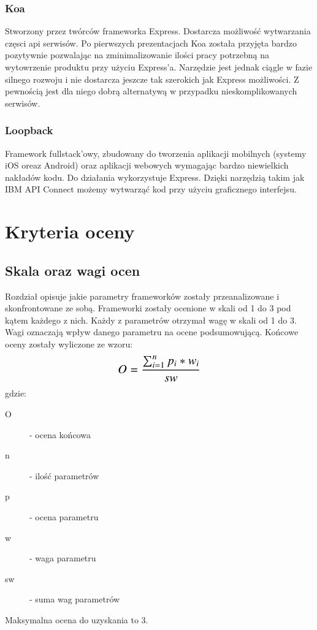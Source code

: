\documentclass[12pt]{report}
\begin{document}
    \subsection{Koa}
    Stworzony przez twórców frameworka Express.
    Dostarcza możliwość wytwarzania częsci api serwisów.
    Po pierwszych prezentacjach Koa została przyjęta bardzo pozytywnie pozwalając na zminimalizowanie ilości pracy potrzebną na wytowrzenie produktu przy użyciu Express'a.
    Narzędzie jest jednak ciągle w fazie silnego rozwoju i nie dostarcza jeszcze tak szerokich jak Express możliwości.
    Z pewnością jest dla niego dobrą alternatywą w przypadku nieskomplikowanych serwisów.

    \subsection{Loopback}
    Framework fullstack'owy, zbudowany do tworzenia aplikacji mobilnych (systemy iOS oreaz Android) oraz aplikacji webowych wymagając bardzo niewielkich nakładów kodu.
    Do działania wykorzystuje Express.
    Dzięki narzędzią takim jak IBM API Connect możemy wytwarząć kod przy użyciu graficznego interfejsu.

\chapter{Kryteria oceny}

  \section{Skala oraz wagi ocen}
    Rozdział opisuje jakie parametry frameworków zostały przeanalizowane i skonfrontowane ze sobą.
    Frameworki zostały ocenione w skali od 1 do 3 pod kątem każdego z nich.
    Każdy z parametrów otrzymał wagę w skali od 1 do 3.
    Wagi oznaczają wpływ danego parametru na ocene podsumowującą.
    Końcowe oceny zostały wyliczone ze wzoru:
    \newline
    \newline
    \[\text{\Large$O = \frac{\sum_{i=1}^{n} p_{i} * w_{i}}{sw}$}\]
    \newline
    gdzie:
    \begin{description}
      \item[O] - ocena końcowa
      \item[n] - ilość parametrów
      \item[p] - ocena parametru
      \item[w] - waga parametru
	    \item[sw] - suma wag parametrów
    \end{description}
    Maksymalna ocena do uzyskania to 3.
\end{document}
